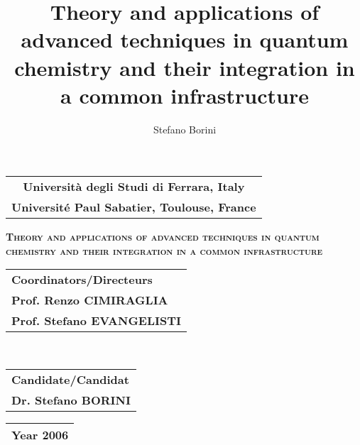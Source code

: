 \documentclass[a4paper,11pt,twoside]{book}
\title{\textbf{Theory and applications of advanced techniques in quantum chemistry
and their integration in a common infrastructure}}
\author{Stefano Borini}
\begin{document}
\begin{titlepage}
\begin{center}
\begin{tabular}{c}
{\Large \textbf{Universit\`a degli Studi di Ferrara, Italy}} \\
{\Large \textbf{Universit\'e Paul Sabatier, Toulouse, France}} \\
\hline
\end{tabular}

\vspace{5cm}
{\textsc{\fontsize{17}{5mm}\selectfont \textbf{Theory and applications of advanced techniques in quantum chemistry
and their integration in a common infrastructure}}}

\vspace{45mm}

{ 
\begin{tabular}{l} \large \textbf{Coordinators/Directeurs} \\
\large \textbf{Prof. Renzo CIMIRAGLIA} \\
\large \textbf{Prof.  Stefano EVANGELISTI}\\
\end{tabular} \hfill {\ } 
 \begin{tabular}{l} \large
\textbf{Candidate/Candidat} \\ \large \textbf{Dr. Stefano BORINI} \end{tabular} }

\vspace{26mm}
\begin{tabular}{c}
\hline
{\large \textbf{Year 2006}} \\
\hline
\end{tabular}

\end{center}
\end{titlepage}
\newpage \pagestyle{empty}
\tableofcontents

\clearpage

\cleardoublepage

\cleardoublepage

\cleardoublepage

\end{document}
